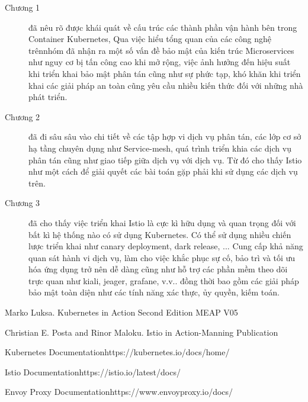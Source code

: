 \documentclass[12pt,a4paper]{report}
\begin{document}
{{	\begin{description}
		\item[Chương 1] đã nêu rõ được khái quát về cấu trúc các thành phần vận hành bên trong Container Kubernetes, Qua việc hiểu tổng quan của các công nghệ trênnhóm đã nhận ra một số vấn đề bảo mật của kiến trúc Microservices như nguy cơ bị tấn công cao khi mở rộng, việc ảnh hưởng đến hiệu suất khi triển khai bảo mật phân tán cũng như sự phức tạp, khó khăn khi triển khai các giải pháp an toàn cũng yêu cầu nhiều kiến thức đối với những nhà phát triển.
		\item[Chương 2] đã đi sâu sâu vào chi tiết về các tập hợp vi dịch vụ phân tán, các lớp cơ sở hạ tầng chuyên dụng như Service-mesh, quá trình triển khia các dịch vụ phân tán cũng như giao tiếp giữa dịch vụ với dịch vụ. Từ đó cho thấy Istio như một cách để giải quyết các bài toán gặp phải khi sử dụng các dịch vụ trên.
		\item[Chương 3] đã cho thấy việc triển khai Istio là cực kì hữu dụng và quan trọng đối với bất kì hệ thống nào có sử dụng Kubernetes. Có thể sử dụng nhiều chiến lược triển khai như canary deployment, dark release, ... Cung cấp khả năng quan sát hành vi dịch vụ, làm cho việc khắc phục sự cố, bảo trì và tối ưu hóa ứng dụng trở nên dễ dàng cũng như hỗ trợ các phần mềm theo dõi trực quan như kiali, jeager, grafane, v.v.. đồng thời bao gồm các giải pháp bảo mật toàn diện như các tính năng xác thực, ủy quyền, kiếm toán.
	\end{description}


\begin{thebibliography}{9}
	Marko Luksa. Kubernetes in Action Second Edition MEAP V05 
	
	Christian E. Posta and Rinor Maloku. Istio in Action-Manning Publication
	
	Kubernetes Documentation{https://kubernetes.io/docs/home/}
	
	Istio Documentation{https://istio.io/latest/docs/}
	
	Envoy Proxy Documentation{https://www.envoyproxy.io/docs/}
\end{thebibliography}

\appendix 
{}
}}
\end{document}
